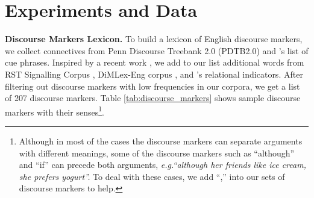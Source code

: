 \section{Experiments and Data}
\textbf{Discourse Markers Lexicon.}
To build a lexicon of English discourse markers, we collect connectives from Penn Discourse Treebank 2.0 (PDTB2.0) \cite{DBLP:conf/lrec/PrasadDLMRJW08} and \cite{marcu1998rhetorical}'s list of cue phrases. Inspired by a recent work \cite{DBLP:conf/sigdial/DasSBS18}, we add to our list additional words from RST Signalling Corpus \cite{das2014rst}, DiMLex-Eng corpus \cite{DBLP:conf/sigdial/DasSBS18}, and \cite{DBLP:journals/ijsc/BiranR11}'s relational indicators. After filtering out discourse markers with low frequencies in our corpora, we get a list of 207 discourse markers. Table \ref{tab:discourse_markers} shows sample discourse markers with their senses\footnote{Although in most of the cases the discourse markers can separate arguments with different meanings, some of the discourse markers such as ``although'' and ``if'' can precede both arguments, \textit{e.g.``although her friends like ice cream, she prefers yogurt''.} To deal with these cases, we add ``,'' into our sets of discourse markers to help.}. 

